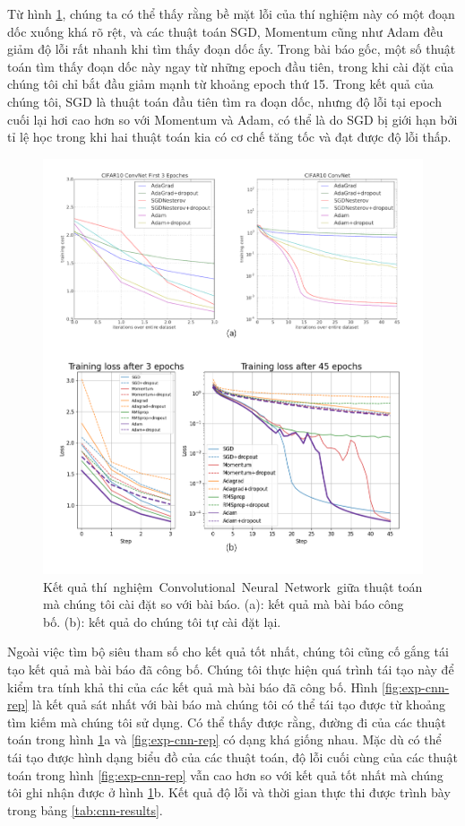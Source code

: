 Từ hình \ref{fig:exp-cnn-best}, chúng ta có thể thấy rằng bề mặt lỗi của thí nghiệm này có một đoạn dốc xuống khá rõ rệt, và các thuật toán SGD, Momentum cũng như Adam đều giảm độ lỗi rất nhanh khi tìm thấy đoạn dốc ấy. Trong bài báo gốc, một số thuật toán tìm thấy đoạn dốc này ngay từ những epoch đầu tiên, trong khi cài đặt của chúng tôi chỉ bắt đầu giảm mạnh từ khoảng epoch thứ 15. Trong kết quả của chúng tôi, SGD là thuật toán đầu tiên tìm ra đoạn dốc, nhưng độ lỗi tại epoch cuối lại hơi cao hơn so với Momentum và Adam, có thể là do SGD bị giới hạn bởi tỉ lệ học trong khi hai thuật toán kia có cơ chế tăng tốc và đạt được độ lỗi thấp.

\begin{figure}[H]
	\centering
	\includegraphics[width=140 mm]{images/cnn.png}
	\caption{Kết quả thí nghiệm Convolutional Neural Network giữa thuật toán mà chúng tôi cài đặt so với bài báo. (a): kết quả mà bài báo công bố. (b): kết quả do chúng tôi tự cài đặt lại.}
	\label{fig:exp-cnn-best}
\end{figure}

Ngoài việc tìm bộ siêu tham số cho kết quả tốt nhất, chúng tôi cũng cố gắng tái tạo kết quả mà bài báo đã công bố. Chúng tôi thực hiện quá trình tái tạo này để kiểm tra tính khả thi của các kết quả mà bài báo đã công bố. Hình \ref{fig:exp-cnn-rep} là kết quả sát nhất với bài báo mà chúng tôi có thể tái tạo được từ khoảng tìm kiếm mà chúng tôi sử dụng. Có thể thấy được rằng, đường đi của các thuật toán trong hình \ref{fig:exp-cnn-best}a và \ref{fig:exp-cnn-rep} có dạng khá giống nhau. Mặc dù có thể tái tạo được hình dạng biểu đồ của các thuật toán, độ lỗi cuối cùng của các thuật toán trong hình \ref{fig:exp-cnn-rep} vẫn cao hơn so với kết quả tốt nhất mà chúng tôi ghi nhận được ở hình \ref{fig:exp-cnn-best}b. Kết quả độ lỗi và thời gian thực thi được trình bày trong bảng \ref{tab:cnn-results}.

